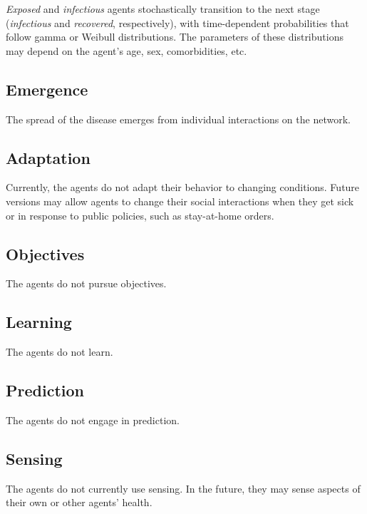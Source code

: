 \documentclass[
]{article}
\begin{document}
\emph{Exposed} and \emph{infectious} agents stochastically transition to
the next stage (\emph{infectious} and \emph{recovered}, respectively),
with time-dependent probabilities that follow gamma or Weibull
distributions. The parameters of these distributions may depend on the
agent's age, sex, comorbidities, etc.

\hypertarget{emergence}{%
\subsection{Emergence}\label{emergence}}

The spread of the disease emerges from individual interactions on the
network.

\hypertarget{adaptation}{%
\subsection{Adaptation}\label{adaptation}}

Currently, the agents do not adapt their behavior to changing
conditions. Future versions may allow agents to change their social
interactions when they get sick or in response to public policies, such
as stay-at-home orders.

\hypertarget{objectives}{%
\subsection{Objectives}\label{objectives}}

The agents do not pursue objectives.

\hypertarget{learning}{%
\subsection{Learning}\label{learning}}

The agents do not learn.

\hypertarget{prediction}{%
\subsection{Prediction}\label{prediction}}

The agents do not engage in prediction.

\hypertarget{sensing}{%
\subsection{Sensing}\label{sensing}}

The agents do not currently use sensing. In the future, they may sense
aspects of their own or other agents' health.
\end{document}
